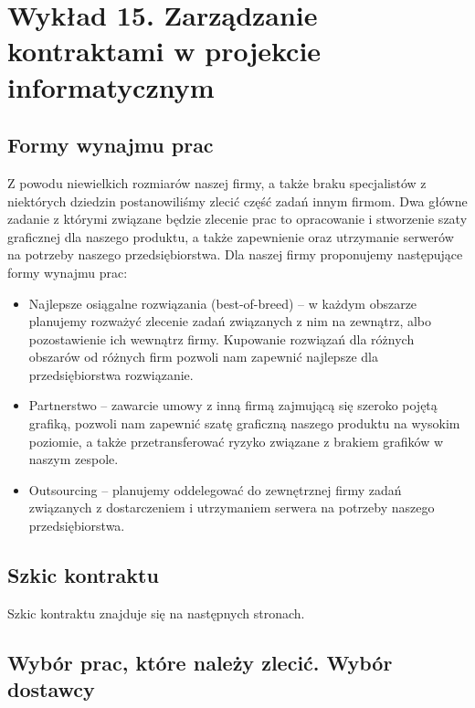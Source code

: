 \chapter{Wykład 15. Zarządzanie kontraktami w projekcie informatycznym}

\section{Formy wynajmu prac}

Z powodu niewielkich rozmiarów naszej firmy, a także braku specjalistów z niektórych dziedzin postanowiliśmy zlecić część zadań innym firmom. Dwa główne zadanie z którymi związane będzie zlecenie prac to opracowanie i stworzenie szaty graficznej dla naszego produktu, a także zapewnienie oraz utrzymanie serwerów na potrzeby naszego przedsiębiorstwa. Dla naszej firmy proponujemy następujące formy wynajmu prac:
\begin{itemize}
\item Najlepsze osiągalne rozwiązania (best-of-breed) – w każdym obszarze planujemy rozważyć zlecenie zadań związanych z nim na zewnątrz, albo pozostawienie ich wewnątrz firmy. Kupowanie rozwiązań dla różnych obszarów od różnych firm pozwoli nam zapewnić najlepsze dla przedsiębiorstwa rozwiązanie.
\item Partnerstwo – zawarcie umowy z inną firmą zajmującą się szeroko pojętą grafiką, pozwoli nam zapewnić szatę graficzną naszego produktu na wysokim poziomie, a także przetransferować ryzyko związane z brakiem grafików w naszym zespole.
\item Outsourcing – planujemy oddelegować do zewnętrznej firmy zadań związanych z dostarczeniem i utrzymaniem serwera na potrzeby naszego przedsiębiorstwa.
\end{itemize}


\section{Szkic kontraktu}

Szkic kontraktu znajduje się na następnych stronach.



\clearpage


\section{Wybór prac, które należy zlecić. Wybór dostawcy}


